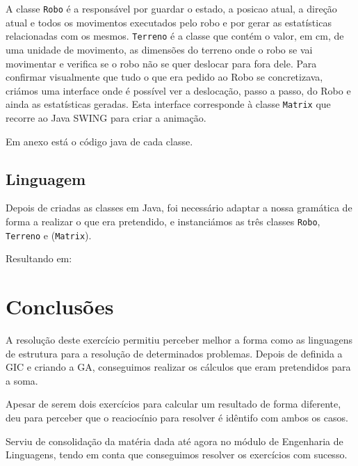 \documentclass[a4paper]{article}
\begin{document}
A classe \verb|Robo| é a responsável por guardar o estado, a posicao atual, a direção atual e todos os movimentos executados pelo robo e por gerar as estatísticas relacionadas com os mesmos. \verb|Terreno| é a classe que contém o valor, em cm, de uma unidade de movimento, as dimensões do terreno onde o robo se vai movimentar e verifica se o robo não se quer deslocar para fora dele. Para confirmar visualmente que tudo o que era pedido ao Robo se concretizava, criámos uma interface onde é possível ver a deslocação, passo a passo, do Robo e ainda as estatísticas geradas. Esta interface corresponde à classe \verb|Matrix| que recorre ao Java SWING para criar a animação.
 
Em anexo está o código java de cada classe.
 
\subsection{Linguagem}
Depois de criadas as classes em Java, foi necessário adaptar a nossa gramática de forma a realizar o que era pretendido, e instanciámos as três classes \verb|Robo|, \verb|Terreno| e (\verb|Matrix|).
 
Resultando em:

 
 
\newpage
 
\section{Conclusões}
 
A resolução deste exercício permitiu perceber melhor a forma como as linguagens
de estrutura para a resolução de determinados problemas. Depois de definida a GIC e
criando a GA, conseguimos realizar os cálculos que eram pretendidos para a soma.
 
Apesar de serem dois exercícios para calcular um resultado de forma diferente,
deu para perceber que o reaciocínio para resolver é idêntifo com ambos os casos.
 
Serviu de consolidação da matéria dada até agora no módulo de Engenharia de Linguagens,
tendo em conta que conseguimos resolver os exercícios com sucesso.
 
 
\end{document}
